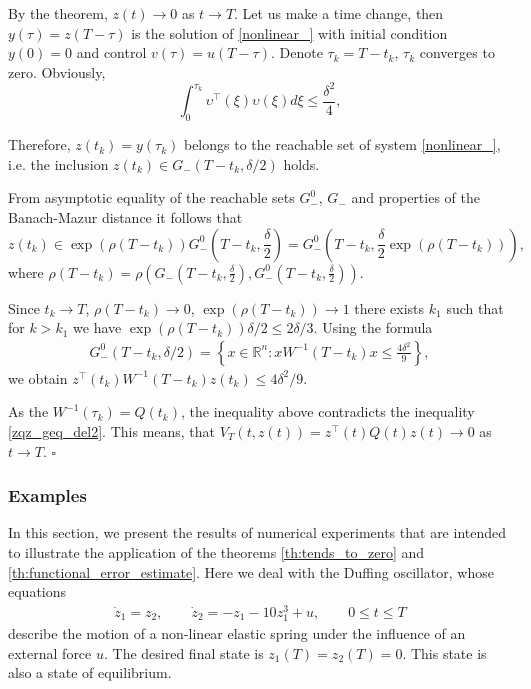 \documentclass[../main.tex]{subfiles}
\begin{document}
    By the theorem, $z(t) \to 0 $ as $t \to T$. Let us make a time change, then $y(\tau)=z(T-\tau)$ is the solution of \eqref{nonlinear_} with initial condition $y(0)=0$ and control $ v(\tau)=u(T-\tau)$. Denote $\tau_k = T - t_k$, $\tau_k $ converges to zero. Obviously, 
    $$\int_{0}^{\tau_k} \upsilon^{\top}(\xi)\upsilon(\xi) 
	d\xi \leqslant \frac{\delta^2}{4}, $$
    
      Therefore, $z(t_k) = y(\tau_k) $ belongs to the reachable set of system \eqref{nonlinear_}, i.e. the inclusion $z(t_k) \in G_{-}(T-t_k,\delta/2)$ holds.
 
 
    From asymptotic equality of the reachable sets $G_{-}^0$, $ G_{-}$ \cite{GusOs} and properties of the  Banach-Mazur distance it  follows  that $$z(t_k) \in \exp(\rho(T-t_k))G_{-}^0(T-t_k,\frac{\delta}{2})=G_{-}^0(T-t_k,\frac{\delta}{2}\exp(\rho(T-t_k)))  , $$ where $\rho(T-t_k)=\rho(G_{-}(T-t_k,\frac{\delta}{2}),G_{-}^0(T-t_k,\frac{\delta}{2}))$.

 Since $t_k \to T$, $\rho(T-t_k) \to 0$, $\exp(\rho(T-t_k)) \to 1$ there exists $k_1$  such that for $k > k_1$ we have $\exp(\rho(T-t_k))\delta/2 \leqslant 2\delta/3$. 
Using the formula
\begin{gather*}
G_{-}^0(T-t_k, \delta/2)=\left\{x \in \mathbb{R}^n: x W^{-1}(T-t_k) x \leqslant \frac{4\delta^2}{9} \right\},	
\end{gather*}
we obtain $ z^{\top}(t_k) W^{-1}(T-t_k) z(t_k) \leqslant 4\delta^2/9$.

 As the $ W^{-1}(\tau_k) = Q(t_k)$, the inequality above contradicts the inequality \eqref{zqz_geq_del2}. This means, that $V_{T}(t,z(t))  =z^{\top}(t)Q(t)z(t) \to 0$  as $t \to T$.
	\hfill $ \square $

\subsubsection{Examples}


In this section, we  present the results of numerical experiments that are intended to illustrate the application of the theorems \ref{th:tends_to_zero} and \ref{th:functional_error_estimate}. Here we deal with the Duffing oscillator, whose equations
\begin{gather}\label{Duffing}
    \dot{z}_1 = z_2, \qquad \dot{z}_2 = -z_1 - 10z_1^3 + u,\qquad 0\leqslant t 
    \leqslant T
\end{gather}
describe the motion of a non-linear elastic spring under the influence of an external force $u$. The desired final state is $z_1(T) = z_2(T) = 0$. This state is also a state of equilibrium. 
\end{document}
